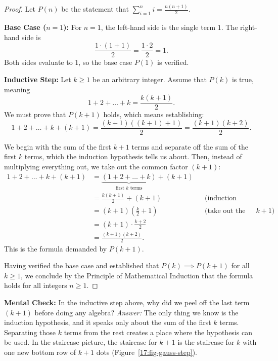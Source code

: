 \begin{proof}
Let $P(n)$ be the statement that $\sum_{i=1}^n i = \frac{n(n+1)}{2}$.

\textbf{Base Case ($n = 1$):}
For $n = 1$, the left-hand side is the single term $1$.
The right-hand side is
\[
\frac{1 \cdot (1 + 1)}{2} = \frac{1 \cdot 2}{2} = 1.
\]
Both sides evaluate to $1$, so the base case $P(1)$ is verified.

\textbf{Inductive Step:}
Let $k \ge 1$ be an arbitrary integer. Assume that $P(k)$ is true, meaning
\[
1 + 2 + \dots + k = \frac{k(k+1)}{2}. \tag{Induction Hypothesis}
\]
We must prove that $P(k+1)$ holds, which means establishing:
\[
1 + 2 + \dots + k + (k+1) = \frac{(k+1)((k+1)+1)}{2} = \frac{(k+1)(k+2)}{2}.
\]

We begin with the sum of the first $k+1$ terms and separate off the sum of the first $k$ terms, which the induction hypothesis tells us about. Then, instead of multiplying everything out, we take out the common factor $(k+1)$:
\begin{align*}
1 + 2 + \dots + k + (k+1)
&= \underbrace{(1 + 2 + \dots + k)}_{\text{first } k \text{ terms}} + (k+1) \\
&= \frac{k(k+1)}{2} + (k+1) && \text{(induction hypothesis)} \\
&= (k+1)\left(\frac{k}{2} + 1\right) && \text{(take out the factor } k+1\text{)} \\
&= (k+1) \cdot \frac{k+2}{2} \\
&= \frac{(k+1)(k+2)}{2}.
\end{align*}
This is the formula demanded by $P(k+1)$.

Having verified the base case and established that $P(k) \implies P(k+1)$ for all $k \ge 1$, we conclude by the Principle of Mathematical Induction that the formula holds for all integers $n \ge 1$.
\end{proof}

\begin{walkbox}
\textbf{Mental Check:} In the inductive step above, why did we peel off the last term $(k+1)$ before doing any algebra?
\emph{Answer:} The only thing we know is the induction hypothesis, and it speaks only about the sum of the first $k$ terms. Separating those $k$ terms from the rest creates a place where the hypothesis can be used. In the staircase picture, the staircase for $k+1$ is the staircase for $k$ with one new bottom row of $k+1$ dots (Figure~\ref{17:fig-gauss-step}).
\end{walkbox}

